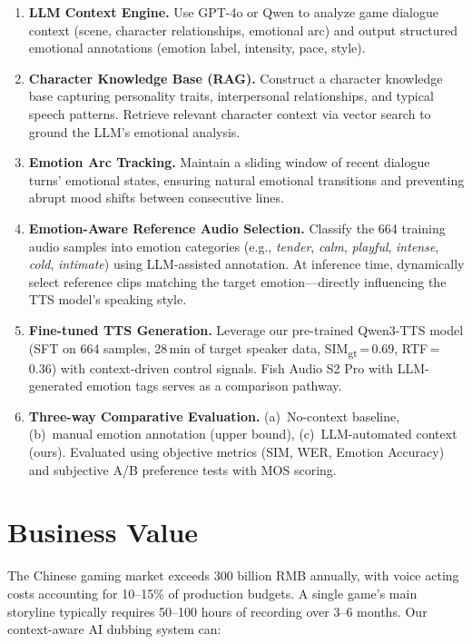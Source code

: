 \documentclass[11pt,a4paper]{article}
\begin{document}
\begin{enumerate}
    \item \textbf{LLM Context Engine.} Use GPT-4o or Qwen to analyze game dialogue context (scene, character relationships, emotional arc) and output structured emotional annotations (emotion label, intensity, pace, style).

    \item \textbf{Character Knowledge Base (RAG).} Construct a character knowledge base capturing personality traits, interpersonal relationships, and typical speech patterns. Retrieve relevant character context via vector search to ground the LLM's emotional analysis.

    \item \textbf{Emotion Arc Tracking.} Maintain a sliding window of recent dialogue turns' emotional states, ensuring natural emotional transitions and preventing abrupt mood shifts between consecutive lines.

    \item \textbf{Emotion-Aware Reference Audio Selection.} Classify the 664 training audio samples into emotion categories (e.g., \emph{tender}, \emph{calm}, \emph{playful}, \emph{intense}, \emph{cold}, \emph{intimate}) using LLM-assisted annotation. At inference time, dynamically select reference clips matching the target emotion---directly influencing the TTS model's speaking style.

    \item \textbf{Fine-tuned TTS Generation.} Leverage our pre-trained Qwen3-TTS model (SFT on 664 samples, 28\,min of target speaker data, SIM\textsubscript{gt}\,=\,0.69, RTF\,=\,0.36) with context-driven control signals. Fish Audio S2 Pro with LLM-generated emotion tags serves as a comparison pathway.

    \item \textbf{Three-way Comparative Evaluation.} (a)~No-context baseline, (b)~manual emotion annotation (upper bound), (c)~LLM-automated context (ours). Evaluated using objective metrics (SIM, WER, Emotion Accuracy) and subjective A/B preference tests with MOS scoring.
\end{enumerate}

\section{Business Value}

The Chinese gaming market exceeds 300 billion RMB annually, with voice acting costs accounting for 10--15\% of production budgets. A single game's main storyline typically requires 50--100 hours of recording over 3--6 months. Our context-aware AI dubbing system can:
\end{document}
